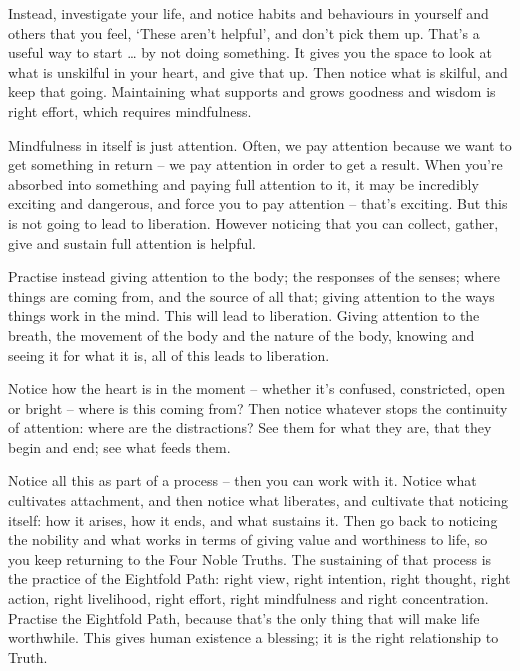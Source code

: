 Instead, investigate your life, and notice habits and
behaviours in yourself and others that you feel, `These aren't helpful',
and don't pick them up. That's a useful way to start \ldots{} by not doing
something. It gives you the space to look at what is unskilful in your heart,
and give that up. Then notice what is skilful, and keep that going. Maintaining
what supports and grows goodness and wisdom is right effort, which requires mindfulness.

Mindfulness in itself is just attention. Often, we pay attention because we want to get something in return -- we pay
attention in order to get a result. When you're absorbed into something and
paying full attention to it, it may be incredibly exciting and dangerous, and force
you to pay attention -- that's exciting. But this is not going to lead to
liberation. However noticing that you can collect, gather, give and sustain full attention is helpful. 

Practise instead giving attention to the body; the responses of the senses;
where things are coming from, and the source of all that; giving attention to the
ways things work in the mind. This will lead to liberation. Giving attention to
the breath, the movement of the body and the nature of the body, knowing and
seeing it for what it is, all of this leads to liberation.

Notice how the heart is in the moment -- whether it's confused, constricted,
open or bright -- where is this coming from? Then notice whatever stops
the continuity of attention: where are the distractions? See them for what they
are, that they begin and end; see what feeds them.

Notice all this as part of a process -- then you can work with it. Notice what
cultivates attachment, and then notice what liberates, and cultivate that
noticing itself: how it arises, how it ends, and what sustains it. Then go back
to noticing the nobility and what works in terms of giving value and worthiness to life, so you keep
returning to the Four Noble Truths. The sustaining of that process is the practice of the
Eightfold Path: right view, right intention, right thought, right action, right
livelihood, right effort, right mindfulness and right concentration. Practise
the Eightfold Path, because that's the only thing that will make life
worthwhile. This gives human existence a blessing; it is the right relationship
to Truth.

\enlargethispage{\baselineskip}


